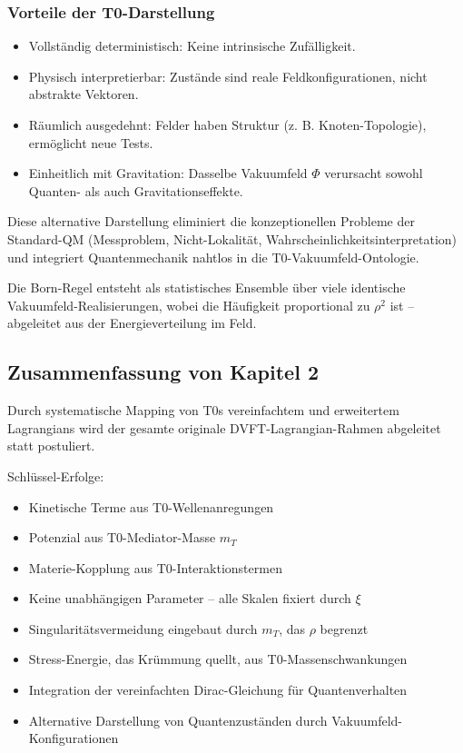 	\subsubsection{Vorteile der T0-Darstellung}
	
	\begin{itemize}
		\item Vollständig deterministisch: Keine intrinsische Zufälligkeit.
		\item Physisch interpretierbar: Zustände sind reale Feldkonfigurationen, nicht abstrakte Vektoren.
		\item Räumlich ausgedehnt: Felder haben Struktur (z. B. Knoten-Topologie), ermöglicht neue Tests.
		\item Einheitlich mit Gravitation: Dasselbe Vakuumfeld $\Phi$ verursacht sowohl Quanten- als auch Gravitationseffekte.
	\end{itemize}
	
	Diese alternative Darstellung eliminiert die konzeptionellen Probleme der Standard-QM (Messproblem, Nicht-Lokalität, Wahrscheinlichkeitsinterpretation) und integriert Quantenmechanik nahtlos in die T0-Vakuumfeld-Ontologie.
	
	Die Born-Regel entsteht als statistisches Ensemble über viele identische Vakuumfeld-Realisierungen, wobei die Häufigkeit proportional zu $\rho^2$ ist – abgeleitet aus der Energieverteilung im Feld.
	
	\subsection{Zusammenfassung von Kapitel 2}
	
	Durch systematische Mapping von T0s vereinfachtem und erweitertem Lagrangians wird der gesamte originale DVFT-Lagrangian-Rahmen abgeleitet statt postuliert.
	
	Schlüssel-Erfolge:
	\begin{itemize}
		\item Kinetische Terme aus T0-Wellenanregungen
		\item Potenzial aus T0-Mediator-Masse $m_T$
		\item Materie-Kopplung aus T0-Interaktionstermen
		\item Keine unabhängigen Parameter – alle Skalen fixiert durch $\xi$
		\item Singularitätsvermeidung eingebaut durch $m_T$, das $\rho$ begrenzt
		\item Stress-Energie, das Krümmung quellt, aus T0-Massenschwankungen
		\item Integration der vereinfachten Dirac-Gleichung für Quantenverhalten
		\item Alternative Darstellung von Quantenzuständen durch Vakuumfeld-Konfigurationen
	\end{itemize}
	
